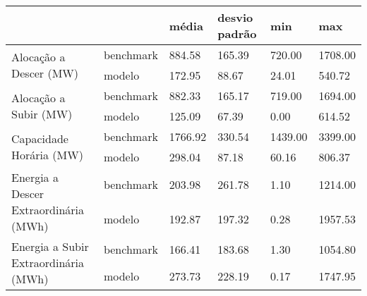 \begin{tabular}{llllll}
\toprule
 &  & média & desvio padrão & min & max \\
\midrule
\multirow[t]{2}{*}{Alocação a Descer (MW)} & benchmark & 884.58 & 165.39 & 720.00 & 1708.00 \\
 & modelo & 172.95 & 88.67 & 24.01 & 540.72 \\
\cline{1-6}
\multirow[t]{2}{*}{Alocação a Subir (MW)} & benchmark & 882.33 & 165.17 & 719.00 & 1694.00 \\
 & modelo & 125.09 & 67.39 & 0.00 & 614.52 \\
\cline{1-6}
\multirow[t]{2}{*}{Capacidade Horária (MW)} & benchmark & 1766.92 & 330.54 & 1439.00 & 3399.00 \\
 & modelo & 298.04 & 87.18 & 60.16 & 806.37 \\
\cline{1-6}
\multirow[t]{2}{*}{Energia a Descer Extraordinária (MWh)} & benchmark & 203.98 & 261.78 & 1.10 & 1214.00 \\
 & modelo & 192.87 & 197.32 & 0.28 & 1957.53 \\
\cline{1-6}
\multirow[t]{2}{*}{Energia a Subir Extraordinária (MWh)} & benchmark & 166.41 & 183.68 & 1.30 & 1054.80 \\
 & modelo & 273.73 & 228.19 & 0.17 & 1747.95 \\
\cline{1-6}
\bottomrule
\end{tabular}

